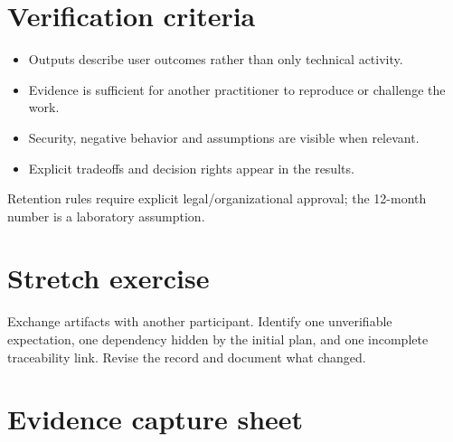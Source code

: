 \documentclass[11pt,letterpaper]{article}
\begin{document}
\section{Verification criteria}
\begin{itemize}[leftmargin=*,itemsep=2pt]
\item Outputs describe user outcomes rather than only technical activity.
\item Evidence is sufficient for another practitioner to reproduce or challenge the work.
\item Security, negative behavior and assumptions are visible when relevant.
\item Explicit tradeoffs and decision rights appear in the results.
\end{itemize}
\begin{tcolorbox}[colback=amberback,colframe=navy,title={Instructor note / expected reasoning},breakable]
Retention rules require explicit legal/organizational approval; the 12-month number is a laboratory assumption.

\end{tcolorbox}
\section{Stretch exercise}
Exchange artifacts with another participant. Identify one unverifiable expectation, one dependency hidden by the initial plan, and one incomplete traceability link. Revise the record and document what changed.

\section{Evidence capture sheet}
\end{document}

